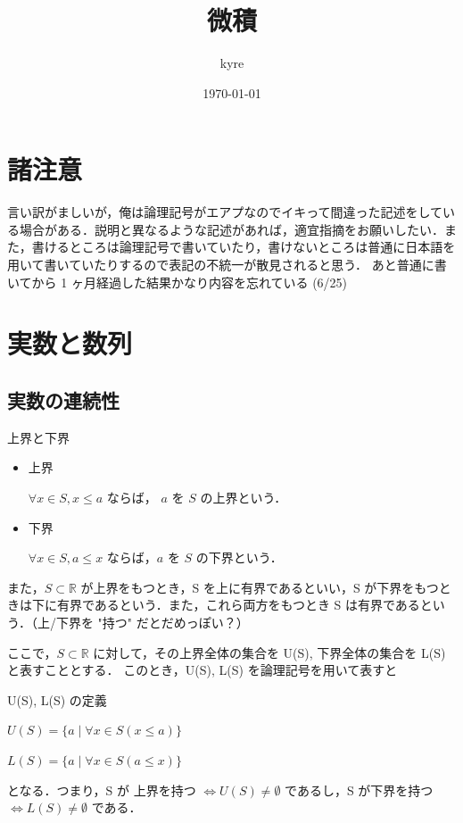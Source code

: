 \documentclass[a4paper]{ltjsarticle}
\title{微積}
\author{kyre}
\date{\today}
\begin{document}
\section*{諸注意}
言い訳がましいが，俺は論理記号がエアプなのでイキって間違った記述をしている場合がある．説明と異なるような記述があれば，適宜指摘をお願いしたい．また，書けるところは論理記号で書いていたり，書けないところは普通に日本語を用いて書いていたりするので表記の不統一が散見されると思う．
あと普通に書いてから 1 ヶ月経過した結果かなり内容を忘れている (6/25)

\section{実数と数列}

\subsection{実数の連続性}

\begin{mytcb}{上界と下界}{}
\begin{itemize}
\item 上界 

$\forall x \in S, x \leq a$ ならば， $a$ を $S$ の上界という．

\item 下界 

$\forall x \in S, a \leq x$ ならば，$a$ を $S$ の下界という．

\end{itemize}
\end{mytcb}

また，$S \subset \mathbb{R}$ が上界をもつとき，S を上に有界であるといい，S が下界をもつときは下に有界であるという．また，これら両方をもつとき S は有界であるという．（上/下界を "持つ" だとだめっぽい？）

ここで，$S \subset \mathbb{R}$ に対して，その上界全体の集合を U(S), 下界全体の集合を L(S) と表すこととする．
このとき，U(S), L(S) を論理記号を用いて表すと
\begin{mytcb}{U(S), L(S) の定義}{}
\centerline
{$
U(S) = \{a \mid \forall x \in S (x \leq a)\}
$}
\centerline
{$
L(S) = \{a \mid \forall x \in S (a \leq x)\}
$}
\end{mytcb}
となる．つまり，S が 上界を持つ $\Leftrightarrow U(S) \neq \emptyset$  であるし，S が下界を持つ $\Leftrightarrow L(S) \neq \emptyset$ である．

\pagebreak
\end{document}
